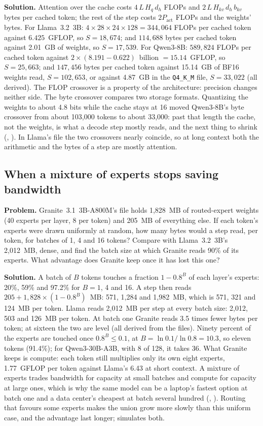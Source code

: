 \textbf{Solution.} Attention over the cache costs $4\,L\,H_q\,d_h$ FLOPs and
$2\,L\,H_{kv}\,d_h\,b_{kv}$ bytes per cached token; the rest of the step costs
$2P_{\text{act}}$ FLOPs and the weights' bytes. For Llama~3.2~3B:
$4 \times 28 \times 24 \times 128 = 344{,}064$ FLOPs per cached token against
$6.425$~GFLOP, so $S = 18{,}674$; and $114{,}688$ bytes per cached token against
2.01~GB of weights, so $S = 17{,}539$. For Qwen3-8B: $589{,}824$ FLOPs per
cached token against $2 \times (8.191 - 0.622)$~billion $= 15.14$~GFLOP, so
$S = 25{,}663$; and $147{,}456$ bytes per cached token against 15.14~GB of BF16
weights read, $S = 102{,}653$, or against 4.87~GB in the \texttt{Q4\_K\_M}
file, $S = 33{,}022$ (all derived). The FLOP crossover is a property of the
architecture: precision changes neither side. The byte crossover compares two
storage formats. Quantizing the weights to about 4.8 bits while the cache stays
at 16 moved Qwen3-8B's byte crossover from about 103,000 tokens to about
33,000: past that length the cache, not the weights, is what a decode step
mostly reads, and the next thing to shrink (,
). In Llama's file the two crossovers nearly coincide,
so at long context both the arithmetic and the bytes of a step are mostly
attention.

\subsection{When a mixture of experts stops saving bandwidth}
\textbf{Problem.} Granite~3.1~3B-A800M's file holds 1,828~MB of routed-expert
weights (40 experts per layer, 8 per token) and 205~MB of everything else. If
each token's experts were drawn uniformly at random, how many bytes would a
step read, per token, for batches of 1, 4 and 16 tokens? Compare with
Llama~3.2~3B's 2,012~MB, dense, and find the batch size at which Granite reads
90\% of its experts. What advantage does Granite keep once it has lost this
one?

\textbf{Solution.} A batch of $B$ tokens touches a fraction $1 - 0.8^B$ of each
layer's experts: 20\%, 59\% and 97.2\% for $B = 1$, 4 and 16. A step then reads
$205 + 1{,}828 \times (1 - 0.8^B)$~MB: 571, 1,284 and 1,982~MB, which is 571,
321 and 124~MB per token. Llama reads 2,012~MB per step at every batch size:
2,012, 503 and 126~MB per token. At batch one Granite reads 3.5 times fewer
bytes per token; at sixteen the two are level (all derived from the files).
Ninety percent of the experts are touched once $0.8^B \le 0.1$, at
$B = \ln 0.1 / \ln 0.8 = 10.3$, so eleven tokens (91.4\%); for Qwen3-30B-A3B,
with 8 of 128, it takes 36. What Granite keeps is compute: each token still
multiplies only its own eight experts, 1.77~GFLOP per token against Llama's
6.43 at short context. A mixture of experts trades bandwidth for capacity at
small batches and compute for capacity at large ones, which is why the same
model can be a laptop's fastest option at batch one and a data center's
cheapest at batch several hundred (,
). Routing that favours some experts makes the
union grow more slowly than this uniform case, and the advantage last longer;
 simulates both.
